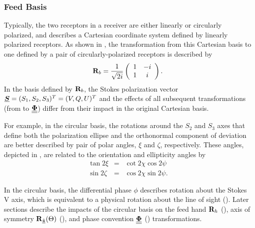 
\subsubsection{Feed Basis}
\label{sec:feed_basis}

Typically, the two receptors in a receiver are either linearly or circularly polarized, and
%
 describes a Cartesian coordinate system defined by linearly polarized receptors.
%
As shown in ,
the transformation from this Cartesian basis to one defined by a pair of circularly-polarized receptors is described by
%
\begin{equation}
\label{eqn:circular}
\JM{R}_b = \frac{1}{\sqrt{2i}}
\left( \begin{array}{cc}
  1 & -i \\
  1 & i
\end{array} \right).
\end{equation}
%
In the basis defined by $\JM{R}_b$, the Stokes polarization vector $\Pv{S}=(S_1, S_2, S_3)^T=(V,Q,U)^T$ and the effects of all subsequent transformations (from  to $\MM{\Phi}$) differ from their impact in the original Cartesian basis.

For example, in the circular basis, the rotations around the $S_2$ and $S_3$ axes that define both the polarization ellipse  and the orthonormal component of deviation  are better described by pair of polar angles, $\xi$ and $\zeta$, respectively.
%
These angles, depicted in , are related to the orientation and ellipticity angles by
\begin{eqnarray}
    \tan2\xi &=& \cot2\chi \cos2\psi \\
    \sin2\zeta &=& \cos2\chi \sin2\psi.
\end{eqnarray}

In the circular basis, the differential phase $\phi$ describes rotation about the Stokes V axis, which is equivalent to a physical rotation about the line of sight ().
%
Later sections describe the impacts of the circular basis on the feed hand $\JM{R}_h$ (), axis of symmetry $\vRotation[z](\Theta)$ (), and phase convention $\MM{\Phi}$ () transformations.



